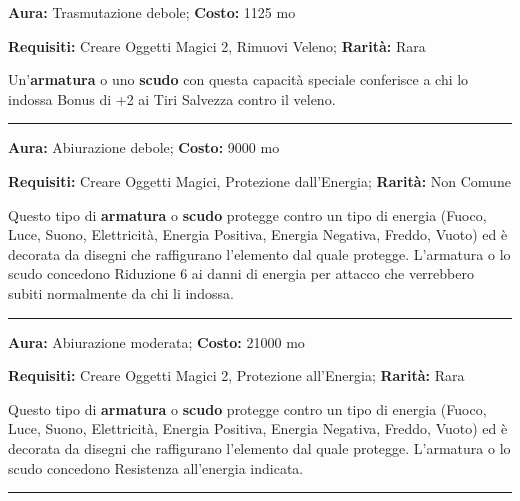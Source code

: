 \begin{multicols}{2}
\textbf{Aura:} Trasmutazione debole; \textbf{Costo:} 1125 mo

\textbf{Requisiti:} Creare Oggetti Magici 2, Rimuovi Veleno; \textbf{Rarità:} Rara

Un'\textbf{armatura} o uno \textbf{scudo} con questa capacità speciale conferisce a chi lo indossa Bonus di +2 ai Tiri Salvezza contro il veleno.

\smallskip\noindent\rule{\linewidth}{2pt}  \hypertarget{Resistenzaall'Energia}{}\smallskip{}\noindent\label{Resistenzaall'Energia}

\textbf{Aura:} Abiurazione debole; \textbf{Costo:} 9000 mo

\textbf{Requisiti:} Creare Oggetti Magici, Protezione dall'Energia; \textbf{Rarità:} Non Comune

Questo tipo di \textbf{armatura} o \textbf{scudo} protegge contro un tipo di energia (Fuoco, Luce, Suono, Elettricità, Energia Positiva, Energia Negativa, Freddo, Vuoto) ed è decorata da disegni che raffigurano l'elemento dal quale protegge. L'armatura o lo scudo concedono Riduzione 6 ai danni di energia per attacco che verrebbero subiti normalmente da chi li indossa.

\smallskip\noindent\rule{\linewidth}{2pt}  \hypertarget{Resistenzaall'EnergiaSuperiore}{}\smallskip{}\noindent\label{Resistenzaall'EnergiaSuperiore}

\textbf{Aura:} Abiurazione moderata; \textbf{Costo:} 21000 mo

\textbf{Requisiti:} Creare Oggetti Magici 2, Protezione all'Energia; \textbf{Rarità:} Rara

Questo tipo di \textbf{armatura} o \textbf{scudo} protegge contro un tipo di energia (Fuoco, Luce, Suono, Elettricità, Energia Positiva, Energia Negativa, Freddo, Vuoto) ed è decorata da disegni che raffigurano l'elemento dal quale protegge. L'armatura o lo scudo concedono Resistenza all'energia indicata.

\smallskip\noindent\rule{\linewidth}{2pt}  \hypertarget{ReteIntralciante}{}\smallskip{}\noindent\label{ReteIntralciante}


\end{multicols}
